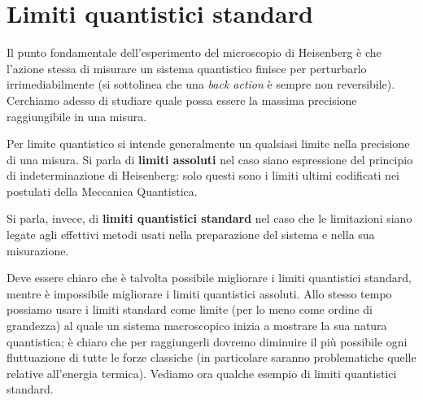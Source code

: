 \vspace{0.5cm}

\noindent  {}

\section{Limiti quantistici standard}

Il punto fondamentale dell'esperimento del microscopio di Heisenberg è che l'azione stessa di misurare un sistema quantistico finisce per perturbarlo irrimediabilmente (si sottolinea che una \textit{back action} è sempre non reversibile). 
Cerchiamo adesso di studiare quale possa essere la massima precisione raggiungibile in una misura.

\begin{definizione}
    Per limite quantistico si intende generalmente un qualsiasi limite nella precisione di una misura. Si parla di \textbf{limiti assoluti} nel caso siano espressione del principio di indeterminazione di Heisenberg: solo questi sono i limiti ultimi codificati nei postulati della Meccanica Quantistica. 
    
    \noindent Si parla, invece, di \textbf{limiti quantistici standard} nel caso che le limitazioni siano legate agli effettivi metodi usati nella preparazione del sistema e nella sua misurazione.
\end{definizione}
\noindent Deve essere chiaro che è talvolta possibile migliorare i limiti quantistici standard, mentre è impossibile migliorare i limiti quantistici assoluti.
\noindent Allo stesso tempo possiamo usare i limiti standard come limite (per lo meno come ordine di grandezza) al quale un sistema macroscopico inizia a mostrare la sua natura quantistica; è chiaro che per raggiungerli dovremo diminuire il più possibile ogni fluttuazione di tutte le forze classiche (in particolare saranno problematiche quelle relative all'energia termica).
Vediamo ora qualche esempio di limiti quantistici standard.
